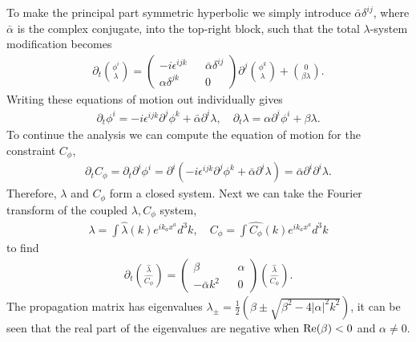 \documentclass[10pt]{report}
\theoremstyle{definition}
\begin{document}
To make the principal part symmetric hyperbolic we simply introduce  $\bar{\alpha} \delta^{ij}$, where $\bar{\alpha}$ is the complex conjugate, into the top-right block, such that the total $\lambda$-system modification becomes 
\begin{align}
    \partial_t \binom{\phi^i}{\lambda} = \begin{pmatrix}
        -i \epsilon^{ijk} && \bar{\alpha} \delta^{ij} \\ \alpha \delta^{jk} && 0
    \end{pmatrix} \partial^j \binom{\phi^k}{\lambda} + \binom{0}{\beta \lambda}.
\end{align}
Writing these equations of motion out individually gives 
\begin{align}
    \partial_t \phi^i = -i\epsilon^{ijk} \partial^j \phi^k + \bar{\alpha} \partial^i \lambda, \quad \partial_t \lambda = \alpha \partial^i \phi^i + \beta \lambda.
\end{align}
To continue the analysis we can compute the equation of motion for the constraint $C_\phi$, 
\begin{align}
    \partial_t C_\phi = \partial_t \partial^i \phi^i = \partial^i \left( -i\epsilon^{ijk} \partial^j \phi^k + \bar{\alpha} \partial^i \lambda \right) = \bar{\alpha} \partial^i \partial^i \lambda.
\end{align}
Therefore, $\lambda$ and $C_\phi$ form a closed system. Next we can take the Fourier transform of the coupled $\lambda,C_\phi$ system,
\begin{align}
    \lambda = \int \hat{\lambda}(k) e^{ik_a x^a} d^3k, \quad C_\phi = \int \hat{C_\phi}(k) e^{ik_a x^a} d^3k
\end{align}
to find 
\begin{align}
    \partial_t \binom{\hat{\lambda}}{\hat{C_\phi}} = \begin{pmatrix}
        \beta && \alpha \\ -\bar{\alpha} k^2 && 0
    \end{pmatrix} \binom{\hat{\lambda}}{\hat{C_\phi}}.
\end{align}
The propagation matrix has eigenvalues $\lambda_\pm = \frac{1}{2} \left( \beta \pm \sqrt{\beta^2 - 4 |\alpha|^2 k^2} \right)$, it can be seen that the real part of the eigenvalues are negative when ${\rm Re}(\beta) <  0$ and $\alpha \neq 0$. 
\end{document}
